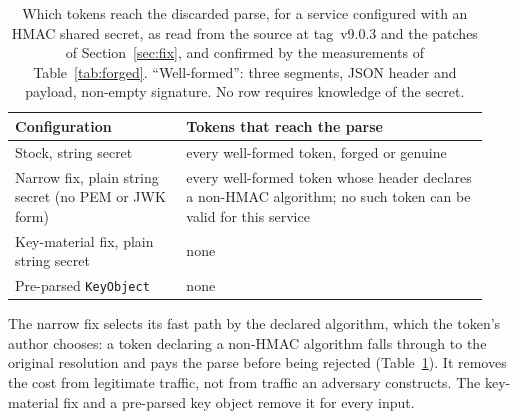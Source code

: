 \documentclass[preprint,12pt,authoryear]{elsarticle}
\newcommand{\LibraryTag}{tag~v9.0.3}
\begin{document}
\begin{table}[!t]
\caption{Which tokens reach the discarded parse, for a service configured with
an HMAC shared secret, as read from the source at \LibraryTag{} and the patches
of Section~\ref{sec:fix}, and confirmed by the measurements of
Table~\ref{tab:forged}. ``Well-formed'': three segments, JSON header and
payload, non-empty signature. No row requires knowledge of the secret.}
\label{tab:reach}
\small
\begin{tabular}{@{}p{0.34\linewidth}p{0.6\linewidth}@{}}
\toprule
Configuration & Tokens that reach the parse \\
\midrule
Stock, string secret & every well-formed token, forged or genuine \\
Narrow fix, plain string secret (no PEM or JWK form) & every well-formed token whose header declares a
non-HMAC algorithm; no such token can be valid for this service \\
Key-material fix, plain string secret & none \\
Pre-parsed \texttt{KeyObject} & none \\
\bottomrule
\end{tabular}
\end{table}

The narrow fix selects its fast path by the declared algorithm, which the
token's author chooses: a token declaring a non-HMAC algorithm falls through to
the original resolution and pays the parse before being rejected
(Table~\ref{tab:reach}). It removes the cost from legitimate traffic, not from
traffic an adversary constructs. The key-material fix and a pre-parsed key
object remove it for every input.
\end{document}

